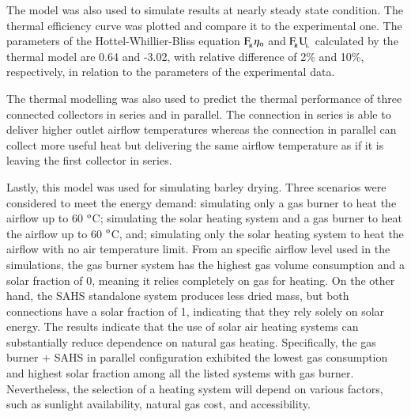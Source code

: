 The model was also used to simulate results at nearly steady state condition. The thermal efficiency curve was plotted and compare it to the experimental one. The parameters of the Hottel-Whillier-Bliss equation $\rm{F_{\!_R}}\eta_{\rm{o}}$ and $\rm{ F_{\!_R}{U_{\!_L}}}$ calculated by the thermal model are 0.64 and -3.02, with relative difference of 2\% and 10\%, respectively, in relation to the parameters of the experimental data.

The thermal modelling was also used to predict the thermal performance of three connected collectors in series and in parallel. The connection in series is able to deliver higher outlet airflow temperatures whereas the connection in parallel can collect more useful heat but delivering the same airflow temperature as if it is leaving the first collector in series.

Lastly, this model was used for simulating barley drying. Three scenarios were considered to meet the energy demand: simulating only a gas burner to heat the airflow up to 60 $^{\rm{o}}$C; simulating the solar heating system and a gas burner to heat the airflow up to 60 $^{\rm{o}}$C, and; simulating only the solar heating system to heat the airflow with no air temperature limit. From an specific airflow level used in the simulations, the gas burner system has the highest gas volume consumption and a solar fraction of 0, meaning it relies completely on gas for heating. On the other hand, the SAHS standalone system produces less dried mass, but both connections have a solar fraction of 1, indicating that they rely solely on solar energy. The results indicate that the use of solar air heating systems can substantially reduce dependence on natural gas heating. Specifically, the gas burner + SAHS in parallel configuration exhibited the lowest gas consumption and highest solar fraction among all the listed systems with gas burner. Nevertheless, the selection of a heating system will depend on various factors, such as sunlight availability, natural gas cost, and accessibility.






